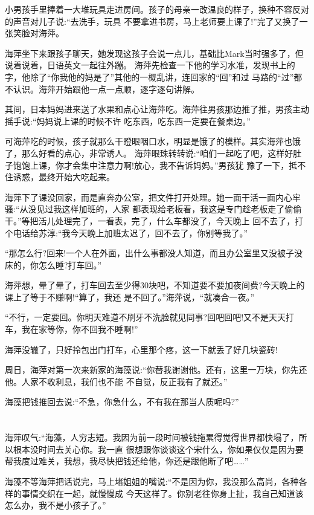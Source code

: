 \documentclass[11pt,a4paper,onecolumn]{article}
\begin{document}
小男孩手里捧着一大堆玩具走进房间。孩子的母亲一改温良的样子，换种不容反对的声音对儿子说:``去洗手，玩具
不要拿进书房，马上老师要上课了!''完了又换了一张笑脸对海萍。

海萍坐下来跟孩子聊天，她发现这孩子会说一点儿，基础比Mark当时强多了，但说着说着，日语英文一起往外蹦。
海萍先检查一下他的学习水准，发现书上的字，他除了``你我他的妈是了''其他的一概乱讲，连回家的``回''和过
马路的``过''都不认识。海萍开始跟他一点一点顺，逐字逐句讲解。

其间，日本妈妈进来送了水果和点心让海萍吃。海萍往男孩那边推了推，男孩主动摇手说:``妈妈说上课的时候不许
吃东西，吃东西一定要在餐桌边。''

可海萍吃的时候，孩子就那么干瞪眼咽口水，明显是饿了的模样。其实海萍也饿了，那么好看的点心，非常诱人。
海萍眼珠转转说:``咱们一起吃了吧，这样好肚子饱饱上课，你才会集中注意力啊!放心，我不告诉妈妈。''男孩犹
豫了一下，抵不住诱惑，最终开始大吃起来。

海萍下了课没回家，而是直奔办公室，把文件打开处理。她一面干活一面内心牢骚:``从没见过我这样加班的，人家
都表现给老板看，我这是专门趁老板走了偷偷干。''等把活儿处理完了，一看表，完了，什么车都没了，今天晚上
回不去了，打个电话给苏淳:``我今天晚上加班太迟了，回不去了，你别等我了。''

``那怎么行?回来!一个人在外面，出什么事都没人知道，而且办公室里又没被子没床的，你怎么睡?打车回。''

海萍想，晕了晕了，打车回去至少得30块吧，不知道要不要加夜间费?今天晚上的课上了等于不赚啊!``算了，我还
是不回了。''海萍说，``就凑合一夜。''

``不行，一定要回。你明天难道不刷牙不洗脸就见同事?回吧回吧!又不是天天打车，我在家等你，你不回我不睡啊!''

海萍没辙了，只好拎包出门打车，心里那个疼，这一下就丢了好几块瓷砖!

周日，海萍对第一次来新家的海藻说:``你替我谢谢他。还有，这里一万块，你先还他。人家不收利息，我们也不能
不自觉，反正我有了就还。''

海藻把钱推回去说:``不急，你急什么，不有我在那当人质呢吗?''

\section[\thesection]{}

海萍叹气:``海藻，人穷志短。我因为前一段时间被钱拖累得觉得世界都快塌了，所以根本没时间去关心你。我一直
很想跟你谈谈这个宋什么，你如果仅仅是因为要帮我度过难关，我想，我尽快把钱还给他，你还是跟他断了吧……''

海藻不等海萍把话说完，马上堵姐姐的嘴说:``不是因为你，我没那么高尚，各种各样的事情交织在一起，就慢慢成
今天这样了。你别老往你身上扯，我自己知道该怎么办，我不是小孩子了。''
\end{document}
